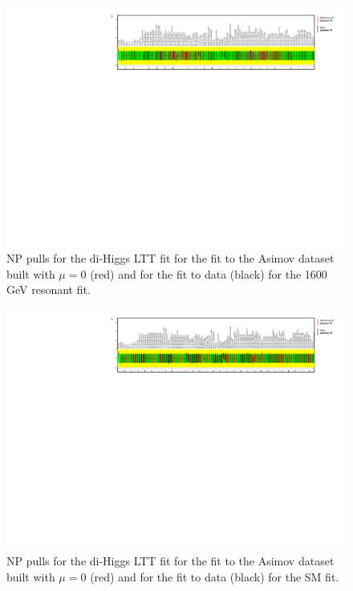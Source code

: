 \begin{figure}
\centering
\includegraphics[angle=270]{figures/results/HH/LepHad/NP_allExceptGammas_2HDM1600_LTT.pdf}
\caption{NP pulls for the di-Higgs \lephad LTT fit for the fit to the Asimov dataset built with $\mu=0$ (red) and for the fit to data (black) for the 1600 GeV resonant fit.}
\label{fig:LepHadPostfitNPPulls2HDM1600LTT}
\end{figure}

\begin{figure}
\centering
\includegraphics[angle=270]{figures/results/HH/LepHad/NP_allExceptGammas_SM_LTT.pdf}
\caption{NP pulls for the di-Higgs \lephad LTT fit for the fit to the Asimov dataset built with $\mu=0$ (red) and for the fit to data (black) for the SM fit.}
\label{fig:LepHadPostfitNPPullsSMLTT}
\end{figure}

